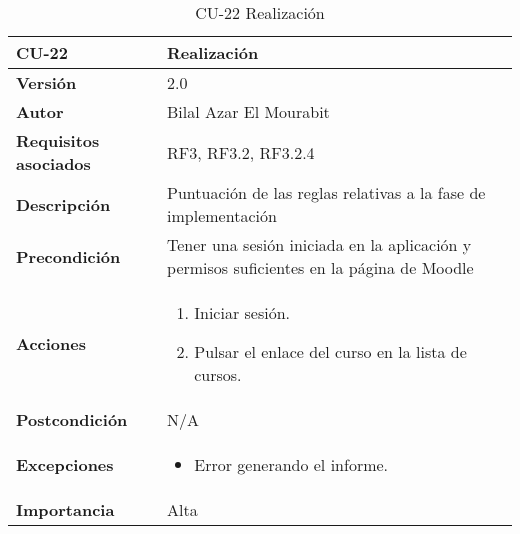 \begin{table}[H]
	\centering
	\begin{tabularx}{\linewidth}{ p{} p{} }
		\toprule
		\textbf{CU-22}    & \textbf{Realización}\\
		\toprule
		\textbf{Versión}              & 2.0    \\
		\textbf{Autor}                & Bilal Azar El Mourabit \\
		\textbf{Requisitos asociados} & RF3, RF3.2, RF3.2.4 \\
		\textbf{Descripción}          & Puntuación de las reglas relativas a la fase de implementación\\
    		\textbf{Precondición}         & Tener una sesión iniciada en la aplicación y permisos suficientes en la página de Moodle\\
		\textbf{Acciones}             & 
		\begin{enumerate}
			\def\labelenumi{\arabic{enumi}.}
			\tightlist
			\item Iniciar sesión.
            \item Pulsar el enlace del curso en la lista de cursos. 
		\end{enumerate}\\
		\textbf{Postcondición}        & N/A \\
		\textbf{Excepciones}          & \begin{itemize}
		    \item Error generando el informe.
		\end{itemize} \\
		\textbf{Importancia}          & Alta \\
		\bottomrule
	\end{tabularx}
	\caption{CU-22 Realización}
\end{table}

